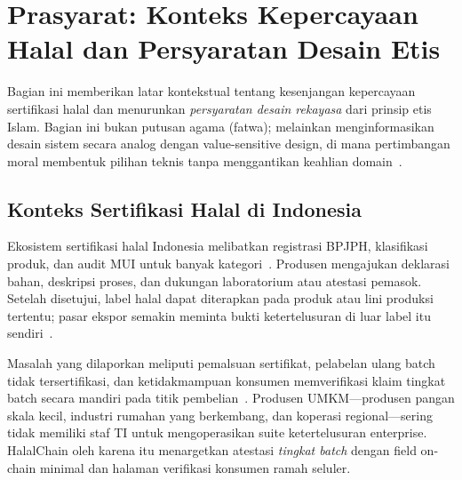\section{Prasyarat: Konteks Kepercayaan Halal dan Persyaratan Desain Etis}
\label{sec:prelim}

Bagian ini memberikan latar kontekstual tentang kesenjangan kepercayaan sertifikasi halal dan menurunkan \emph{persyaratan desain rekayasa} dari prinsip etis Islam.
Bagian ini bukan putusan agama (fatwa); melainkan menginformasikan desain sistem secara analog dengan value-sensitive design, di mana pertimbangan moral membentuk pilihan teknis tanpa menggantikan keahlian domain~\cite{friedman2017value}.

\subsection{Konteks Sertifikasi Halal di Indonesia}
Ekosistem sertifikasi halal Indonesia melibatkan registrasi BPJPH, klasifikasi produk, dan audit MUI untuk banyak kategori~\cite{sidarto2021halal,bpjph2022regulation}.
Produsen mengajukan deklarasi bahan, deskripsi proses, dan dukungan laboratorium atau atestasi pemasok.
Setelah disetujui, label halal dapat diterapkan pada produk atau lini produksi tertentu; pasar ekspor semakin meminta bukti ketertelusuran di luar label itu sendiri~\cite{marianingsih2024halal}.

Masalah yang dilaporkan meliputi pemalsuan sertifikat, pelabelan ulang batch tidak tersertifikasi, dan ketidakmampuan konsumen memverifikasi klaim tingkat batch secara mandiri pada titik pembelian~\cite{rashid2018halal,kshetri2018blockchain}.
Produsen UMKM---produsen pangan skala kecil, industri rumahan yang berkembang, dan koperasi regional---sering tidak memiliki staf TI untuk mengoperasikan suite ketertelusuran enterprise.
HalalChain oleh karena itu menargetkan atestasi \emph{tingkat batch} dengan field on-chain minimal dan halaman verifikasi konsumen ramah seluler.


